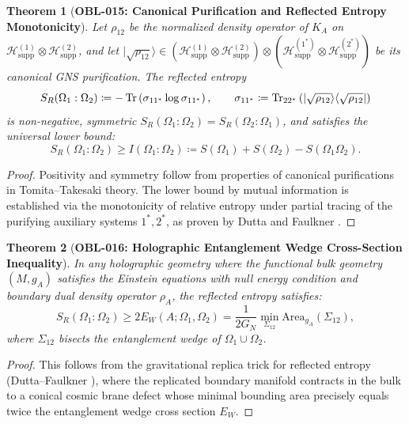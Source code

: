 \documentclass[11pt,a4paper,reqno]{amsart}
\newtheorem{theorem}{Theorem}[section]
\theoremstyle{definition}
\theoremstyle{remark}
\numberwithin{equation}{section}
\begin{document}
\begin{theorem}[\textbf{OBL-015: Canonical Purification and Reflected Entropy Monotonicity}]
\label{thm:reflected_entropy_prop}
Let $\rho_{12}$ be the normalized density operator of $K_A$ on $\mathcal{H}_{\mathrm{supp}}^{(1)} \otimes \mathcal{H}_{\mathrm{supp}}^{(2)}$, and let $|\sqrt{\rho_{12}}\rangle \in (\mathcal{H}_{\mathrm{supp}}^{(1)} \otimes \mathcal{H}_{\mathrm{supp}}^{(2)}) \otimes (\mathcal{H}_{\mathrm{supp}}^{(1^*)} \otimes \mathcal{H}_{\mathrm{supp}}^{(2^*)})$ be its canonical GNS purification. The reflected entropy
\begin{equation}
S_R(\Omega_1 : \Omega_2) \coloneqq -\Tr\left( \sigma_{1 1^*} \log \sigma_{1 1^*} \right), \qquad \sigma_{1 1^*} \coloneqq \Tr_{2 2^*}\left( |\sqrt{\rho_{12}}\rangle \langle\sqrt{\rho_{12}}| \right)
\end{equation}
is non-negative, symmetric $S_R(\Omega_1 : \Omega_2) = S_R(\Omega_2 : \Omega_1)$, and satisfies the universal lower bound:
\begin{equation}
S_R(\Omega_1 : \Omega_2) \ge I(\Omega_1 : \Omega_2) \coloneqq S(\Omega_1) + S(\Omega_2) - S(\Omega_1 \Omega_2).
\end{equation}
\end{theorem}

\begin{proof}
Positivity and symmetry follow from properties of canonical purifications in Tomita--Takesaki theory. The lower bound by mutual information is established via the monotonicity of relative entropy under partial tracing of the purifying auxiliary systems $1^*, 2^*$, as proven by Dutta and Faulkner \cite{DuttaFaulkner2019}.
\end{proof}

\begin{theorem}[\textbf{OBL-016: Holographic Entanglement Wedge Cross-Section Inequality}]
\label{thm:holographic_ew_inequality}
In any holographic geometry where the functional bulk geometry $(M, g_A)$ satisfies the Einstein equations with null energy condition and boundary dual density operator $\rho_A$, the reflected entropy satisfies:
\begin{equation}
S_R(\Omega_1 : \Omega_2) \ge 2 E_W(A; \Omega_1, \Omega_2) = \frac{1}{2 G_N} \min_{\Sigma_{12}} \mathrm{Area}_{g_A}(\Sigma_{12}),
\end{equation}
where $\Sigma_{12}$ bisects the entanglement wedge of $\Omega_1 \cup \Omega_2$.
\end{theorem}

\begin{proof}
This follows from the gravitational replica trick for reflected entropy (Dutta--Faulkner \cite{DuttaFaulkner2019}), where the replicated boundary manifold contracts in the bulk to a conical cosmic brane defect whose minimal bounding area precisely equals twice the entanglement wedge cross section $E_W$.
\end{proof}
\end{document}

